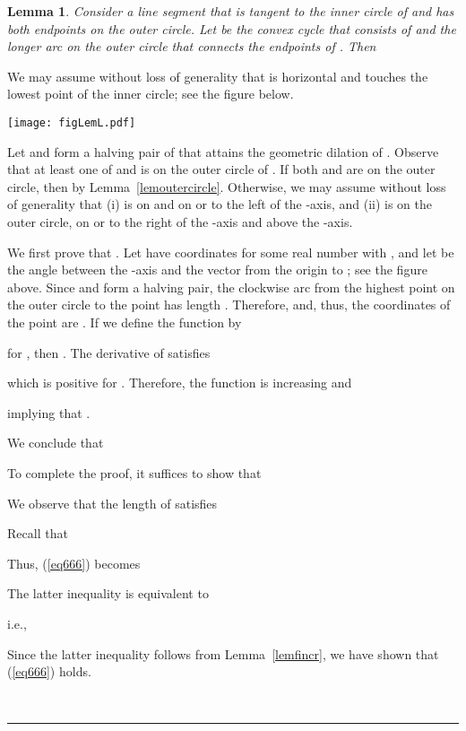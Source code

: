 \documentclass[12pt]{article}
\newtheorem{lemma}{Lemma}
\newcommand{\qed}{\rule{0.5em}{1.5ex}}
\newcommand{\fqed}{{\hfill~\qed}}
\newenvironment{proof}{{\noindent \bf Proof.}}
                      {{\hfill \fqed} \vspace{1em}}
\begin{document}
\begin{lemma}   \label{lemthree}  
Consider a line segment  that is tangent to the inner circle of 
 and has both endpoints on the outer circle. Let  be the 
convex cycle that consists of  and the longer arc on the outer circle 
that connects the endpoints of . Then 
  
\end{lemma} 
\begin{proof} 
We may assume without loss of generality that  is horizontal and 
touches the lowest point of the inner circle; see the figure below. 

\begin{center}
   \texttt{[image: figLemL.pdf]}
\end{center}

Let  and  form a halving pair of  that attains the geometric 
dilation of . Observe that at least one of  and  is on the 
outer circle of . If both  and  are on the outer 
circle, then  by Lemma~\ref{lemoutercircle}. 
Otherwise, we may assume without loss of generality that 
(i)  is on  and on or to the left of the -axis, and 
(ii)  is on the outer circle, on or to the right of the -axis 
and above the -axis. 

We first prove that . Let  have coordinates  
for some real number  with , and 
let  be the angle between the -axis and the vector from the 
origin to ; see the figure above. Since  and  form a halving 
pair, the clockwise arc from the highest point on the outer circle to 
the point  has length . Therefore,  and, thus, 
the coordinates of the point  are 
.   
If we define the function  by 

for , then . 
The derivative of  satisfies 

which is positive for . Therefore, the 
function  is increasing and 

implying that . 

We conclude that 
  
To complete the proof, it suffices to show that 
  
We observe that the length of  satisfies 
 
Recall that 

Thus, (\ref{eq666}) becomes 

The latter inequality is equivalent to 
 
i.e., 
 
Since the latter inequality follows from Lemma~\ref{lemfincr}, 
we have shown that (\ref{eq666}) holds. 
\end{proof}  
\end{document}
